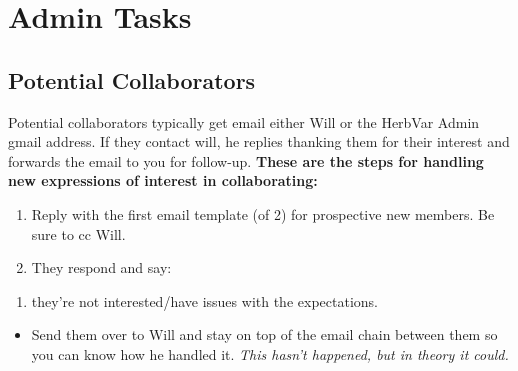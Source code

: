 \documentclass[
  letterpaper,
  DIV=11,
  numbers=noendperiod]{scrreprt}
\providecommand{\tightlist}{%
  \setlength{\itemsep}{0pt}\setlength{\parskip}{0pt}}\usepackage{longtable,booktabs,array}
\begin{document}
\begin{figure}


\caption{\label{fig-herbvivores5}}

\end{figure}%

\part{Admin Tasks}

\chapter{Potential Collaborators}\label{potential-collaborators}

Potential collaborators typically get email either Will or the HerbVar
Admin gmail address. If they contact will, he replies thanking them for
their interest and forwards the email to you for follow-up.
\textbf{These are the steps for handling new expressions of interest in
collaborating:}

\begin{enumerate}
\def\labelenumi{\arabic{enumi}.}
\item
  Reply with the first email template (of 2) for prospective new
  members. Be sure to cc Will.
\item
  They respond and say:
\end{enumerate}

\begin{enumerate}
\def\labelenumi{\alph{enumi})}
\tightlist
\item
  they're not interested/have issues with the expectations.
\end{enumerate}

\begin{itemize}
\tightlist
\item
  Send them over to Will and stay on top of the email chain between them
  so you can know how he handled it. \emph{This hasn't happened, but in
  theory it could.}
\end{itemize}
\end{document}
